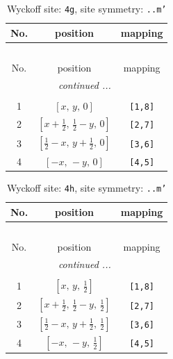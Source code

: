 \documentclass[fleqn,8pt]{jsarticle}
\begin{document}
\renewcommand{\arraystretch}{1.2}
\begin{longtable}{ccc}
\caption{Wyckoff site: {\tt 4g}, site symmetry: {\tt ..m'}}
 \\
 \hline \hline
No. & position & mapping \\ \hline \endfirsthead

\multicolumn{2}{l}{\tablename\ \thetable{}} \\
 \hline \hline
No. & position & mapping \\ \hline \endhead

 \hline \hline
\multicolumn{2}{r}{\footnotesize\it continued ...} \\ \endfoot

 \hline \hline
\multicolumn{2}{r}{} \\ \endlastfoot

1 & $\left[ x,\, y,\, 0 \right]$ & {\tt [1,8]} \\ \hline
2 & $\left[ x + \frac{1}{2},\, \frac{1}{2} - y,\, 0 \right]$ & {\tt [2,7]} \\ \hline
3 & $\left[ \frac{1}{2} - x,\, y + \frac{1}{2},\, 0 \right]$ & {\tt [3,6]} \\ \hline
4 & $\left[ - x,\, - y,\, 0 \right]$ & {\tt [4,5]} \\
\end{longtable}
\renewcommand{\arraystretch}{1.2}
\begin{longtable}{ccc}
\caption{Wyckoff site: {\tt 4h}, site symmetry: {\tt ..m'}}
 \\
 \hline \hline
No. & position & mapping \\ \hline \endfirsthead

\multicolumn{2}{l}{\tablename\ \thetable{}} \\
 \hline \hline
No. & position & mapping \\ \hline \endhead

 \hline \hline
\multicolumn{2}{r}{\footnotesize\it continued ...} \\ \endfoot

 \hline \hline
\multicolumn{2}{r}{} \\ \endlastfoot

1 & $\left[ x,\, y,\, \frac{1}{2} \right]$ & {\tt [1,8]} \\ \hline
2 & $\left[ x + \frac{1}{2},\, \frac{1}{2} - y,\, \frac{1}{2} \right]$ & {\tt [2,7]} \\ \hline
3 & $\left[ \frac{1}{2} - x,\, y + \frac{1}{2},\, \frac{1}{2} \right]$ & {\tt [3,6]} \\ \hline
4 & $\left[ - x,\, - y,\, \frac{1}{2} \right]$ & {\tt [4,5]} \\
\end{longtable}
\end{document}
